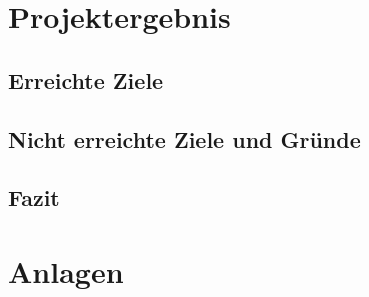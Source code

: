 \documentclass[a4paper, 11pt]{scrartcl}
\begin{document}
\section{Projektergebnis}
\subsection{Erreichte Ziele}


\subsection{Nicht erreichte Ziele und Gründe}


\subsection{Fazit}
\newpage
\section{Anlagen}
\end{document}
